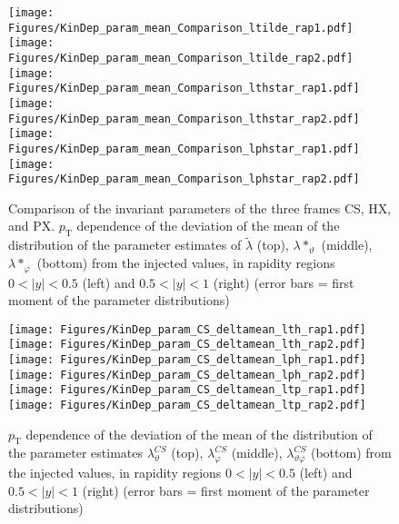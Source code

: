 \documentclass[12pt]{article}
\newcommand{\pT}{p_\mathrm{T}}
\newcommand{\absy}{\left |  y \right |}
\newcommand{\lamtilde}{\tilde{\lambda}}
\newcommand{\lamthstar}{\lambda*_\vartheta}
\newcommand{\lamphstar}{\lambda*_\varphi}
\newcommand{\lamthCS}{\lambda^{\scriptscriptstyle CS}_\vartheta}
\newcommand{\lamphCS}{\lambda^{\scriptscriptstyle CS}_\varphi}
\newcommand{\lamthphCS}{\lambda^{\scriptscriptstyle CS}_{\vartheta \varphi}}
\begin{document}




\begin{figure}[htbp]
\centering
\texttt{[image: Figures/KinDep\_param\_mean\_Comparison\_ltilde\_rap1.pdf]}
\texttt{[image: Figures/KinDep\_param\_mean\_Comparison\_ltilde\_rap2.pdf]}
\texttt{[image: Figures/KinDep\_param\_mean\_Comparison\_lthstar\_rap1.pdf]}
\texttt{[image: Figures/KinDep\_param\_mean\_Comparison\_lthstar\_rap2.pdf]}
\texttt{[image: Figures/KinDep\_param\_mean\_Comparison\_lphstar\_rap1.pdf]}
\texttt{[image: Figures/KinDep\_param\_mean\_Comparison\_lphstar\_rap2.pdf]}
\caption{Comparison of the invariant parameters of the three frames CS, HX,
and PX. $\pT$ dependence of the deviation of the mean of the distribution of the
parameter estimates of $\lamtilde$ (top), $\lamthstar$ (middle), $\lamphstar$ (bottom) from the injected values, in rapidity regions $0<\absy<0.5$ (left) and
$0.5<\absy<1$ (right) (error bars = first moment of the parameter
distributions)}
\end{figure}
\clearpage











\begin{figure}[htbp]
\centering
\texttt{[image: Figures/KinDep\_param\_CS\_deltamean\_lth\_rap1.pdf]}
\texttt{[image: Figures/KinDep\_param\_CS\_deltamean\_lth\_rap2.pdf]}
\texttt{[image: Figures/KinDep\_param\_CS\_deltamean\_lph\_rap1.pdf]}
\texttt{[image: Figures/KinDep\_param\_CS\_deltamean\_lph\_rap2.pdf]}
\texttt{[image: Figures/KinDep\_param\_CS\_deltamean\_ltp\_rap1.pdf]}
\texttt{[image: Figures/KinDep\_param\_CS\_deltamean\_ltp\_rap2.pdf]}
\caption{$\pT$ dependence of the deviation of the mean of the distribution of
the parameter estimates $\lamthCS$ (top), $\lamphCS$ (middle), $\lamthphCS$
(bottom) from the injected values, in rapidity regions $0<\absy<0.5$ (left) and
$0.5<\absy<1$ (right) (error bars = first moment of the parameter
distributions)}
\end{figure}
\clearpage
\end{document}

